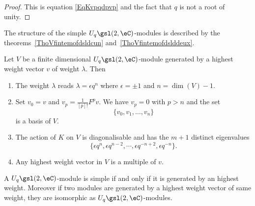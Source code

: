 \begin{proof}
	This is equation \eqref{EqKvpqdpvp} and the fact that \( q\) is not a root of unity.
\end{proof}

The structure of the simple \( U_q\gsl(2,\eC)\)-modules is described by the theorems~\ref{ThoVfintemofdsldcun} and~\ref{ThoVfintemofdslddeux}.

\begin{theorem}     \label{ThoVfintemofdsldcun}
	Let \( V\) be a finite dimensional \( U_q\gsl(2,\eC)\)-module generated by a highest weight vector \( v\) of weight \( \lambda\). Then
	\begin{enumerate}
		\item       \label{ItemThoVintmoddcuni}
		      The weight \( \lambda\) reads \( \lambda=\epsilon q^n\) where \( \epsilon=\pm 1\) and \( n=\dim(V)-1\).
		\item       \label{ItemThoVintmoddcunii}
		      Set \( v_0=v\) and \( v_p=\frac{1}{ [p]! }F^pv\). We have \( v_p=0\) with \( p>n\) and the set
		      \begin{equation}
			      \{ v_0,v_1,\ldots,v_n \}
		      \end{equation}
		      is a basis of \( V\).
		\item       \label{ItemThoVintmoddcuniii}
		      The action of \( K\) on \( V\) is diagonalisable and has the \( m+1\) distinct eigenvalues
		      \begin{equation}
			      \{ \epsilon q^n,\epsilon q^{n-2},\cdots,\epsilon q^{-n+2},\epsilon q^{-n} \}.
		      \end{equation}
		\item       \label{ItemThoVintmoddcuniv}
		      Any highest weight vector in \( V\) is a multiple of \( v\).
	\end{enumerate}
\end{theorem}

\begin{theorem}     \label{ThoVfintemofdslddeux}
	A \( U_q\gsl(2,\eC)\)-module is simple if and only if it is generated by an highest weight. Moreover if two modules are generated by a highest weight vector of same weight, they are isomorphic as \( U_q\gsl(2,\eC)\)-modules.
\end{theorem}

